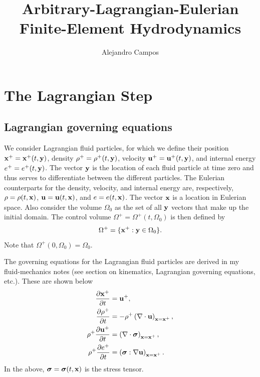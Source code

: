 \documentclass[11pt]{report}
\title{Arbitrary-Lagrangian-Eulerian Finite-Element Hydrodynamics}
\author{Alejandro Campos}
\begin{document}
\maketitle
\tableofcontents

\chapter{The Lagrangian Step}
\section{Lagrangian governing equations}
We consider Lagrangian fluid particles, for which we define their position $\mathbf{x}^+=\mathbf{x}^+(t,\mathbf{y})$, density $\rho^+ = \rho^+(t,\mathbf{y})$, velocity $\mathbf{u}^+ = \mathbf{u}^+(t,\mathbf{y})$, and internal energy $e^+ = e^+(t,\mathbf{y})$. The vector $\mathbf{y}$ is the location of each fluid particle at time zero and thus serves to differentiate between the different particles. The Eulerian counterparts for the density, velocity, and internal energy are, respectively, $\rho = \rho(t,\mathbf{x})$, $\mathbf{u} = \mathbf{u}(t,\mathbf{x})$, and $e = e(t,\mathbf{x})$. The vector $\mathbf{x}$ is a location in Eulerian space. Also consider the volume $\Omega_0$ as the set of all $\mathbf{y}$ vectors that make up the initial domain. The control volume $\Omega^+ = \Omega^+(t, \Omega_0)$ is then defined by
\begin{equation}
    \Omega^+ = \{ \mathbf{x}^+:\mathbf{y} \in \Omega_0 \}.
\end{equation}
Note that $\Omega^+(0,\Omega_0) = \Omega_0$.

The governing equations for the Lagrangian fluid particles are derived in my fluid-mechanics notes (see section on kinematics, Lagrangian governing equations, etc.). These are shown below
\begin{align}
    \frac{\partial \mathbf{x}^+}{\partial t} &= \mathbf{u}^+, \label{eq:lag_gov_evol_x} \\
    \frac{\partial \rho^+}{\partial t} &= -\rho^+ \left( \nabla \cdot \mathbf{u} \right)_{\mathbf{x} = \mathbf{x}^+}, \label{eq:lag_gov_evol_rho} \\
    \rho^+ \frac{\partial \mathbf{u}^+}{\partial t} &= \left ( \nabla \cdot \bm \sigma \right )_{\mathbf{x} = \mathbf{x}^+}, \label{eq:lag_gov_evol_u} \\
    \rho^+ \frac{\partial e^+}{\partial t} &= \left ( \bm \sigma : \nabla \mathbf{u} \right )_{\mathbf{x} = \mathbf{x}^+}. \label{eq:lag_gov_evol_e}
\end{align}
In the above, $\bm \sigma = \bm \sigma(t,\mathbf{x})$ is the stress tensor.
\end{document}
